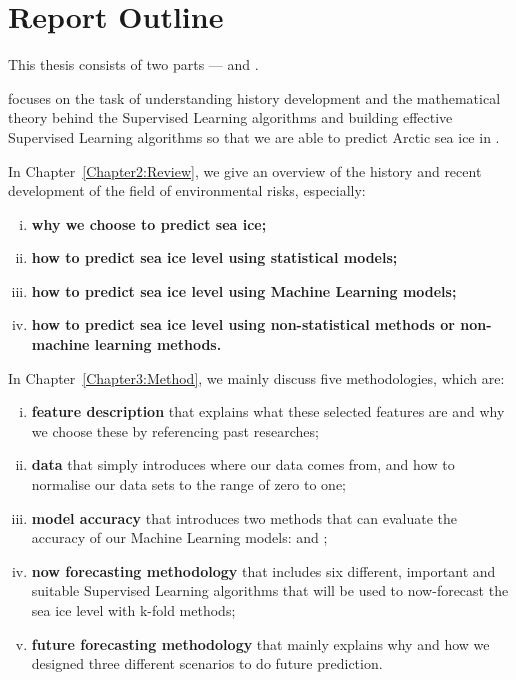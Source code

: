 \section{Report Outline} %

This thesis consists of two parts ---  and .

 focuses on the task of understanding history development and the mathematical theory behind the Supervised Learning algorithms and building effective Supervised Learning algorithms so that we are able to predict Arctic sea ice in .
\begin{description}
    \item In Chapter~\ref{Chapter2:Review}, we give an overview of the history and recent development of the field of environmental risks, especially:
        \begin{enumerate}[(i)]
            \item 
                \textbf{why we choose to predict sea ice;}
            \item
                \textbf{how to predict sea ice level using statistical models;}
            \item
                \textbf{how to predict sea ice level using Machine Learning models;}
            \item
                \textbf{how to predict sea ice level using non-statistical methods or non-machine learning methods.}
        \end{enumerate}
    
    \item In Chapter~\ref{Chapter3:Method}, we mainly discuss five methodologies, which are:
        \begin{enumerate}[(i)]
            \item
                \textbf{feature description} that explains what these selected features are and why we choose these by referencing past researches;
            \item 
                \textbf{data} that simply introduces where our data comes from, and how to normalise our data sets to the range of zero to one;
            \item
                \textbf{model accuracy} that introduces two methods that can evaluate the accuracy of our Machine Learning models:  and ;
            \item
                \textbf{now forecasting methodology} that includes six different, important and suitable Supervised Learning algorithms that will be used to now-forecast the sea ice level with k-fold methods;
            \item
                \textbf{future forecasting methodology} that mainly explains why and how we designed three different scenarios to do future prediction.
        \end{enumerate}
\end{description}


